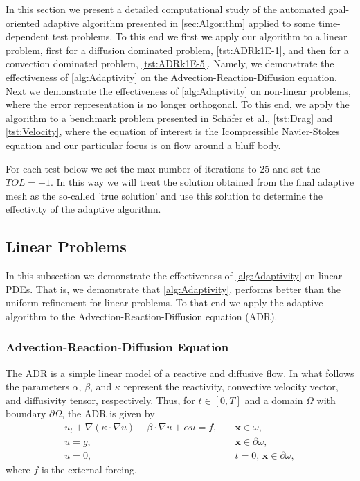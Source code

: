 In this section we present a detailed computational study of the automated
goal-oriented adaptive algorithm presented in \autoref{sec:Algorithm} applied to
some time-dependent test problems. To this end we first we apply our algorithm
to a linear problem, first for a diffusion dominated problem,
\autoref{tst:ADRk1E-1}, and then for a convection dominated problem,
\autoref{tst:ADRk1E-5}.  Namely, we demonstrate the effectiveness of
\autoref{alg:Adaptivity} on the Advection-Reaction-Diffusion equation. Next we
demonstrate the effectiveness of \autoref{alg:Adaptivity} on non-linear
problems, where the error representation is no longer orthogonal. To this end,
we apply the algorithm to a benchmark problem presented in Sch{\"a}fer et
al.\cite{Schaefer1996}, \autoref{tst:Drag} and \autoref{tst:Velocity}, where the
equation of interest is the Icompressible Navier-Stokes equation and our
particular focus is on flow around a bluff body.

For each test below we set the max number of iterations to $25$ and set the
$TOL=-1$. In this way we will treat the solution obtained from the final
adaptive mesh as the so-called 'true solution' and use this solution to
determine the effectivity of the adaptive algorithm.

\subsection{Linear Problems}
    In this subsection we demonstrate the effectiveness of
    \autoref{alg:Adaptivity} on linear PDEs. That is, we demonstrate that
    \autoref{alg:Adaptivity}, performs better than the uniform refinement for
    linear problems. To that end we apply the adaptive algorithm to
    the Advection-Reaction-Diffusion equation (ADR).

\subsubsection{Advection-Reaction-Diffusion Equation} \label{sss:ADR}
    The ADR is a simple linear model of a reactive and diffusive flow.  In what
    follows the parameters $\alpha,\,\beta$, and $\kappa$ represent the
    reactivity, convective velocity vector, and diffusivity tensor,
    respectively. Thus, for $t\in [0,T]$ and a domain $\Omega$ with boundary
    $\partial \Omega$, the ADR is given by
    \begin{equation}
        \begin{split}
            u_t + \nabla \left(\kappa\cdot \nabla u \right) + \beta \cdot \nabla
                u + \alpha u = f,& \quad \mathbf{x} \in \omega, \\
            u = g,& \quad \mathbf{x} \in \partial \omega, \\
            u = 0,& \quad t = 0,\, \mathbf{x} \in \partial \omega,
        \end{split}
        \label{eq:ADR}
    \end{equation}
    where $f$ is the external forcing.

